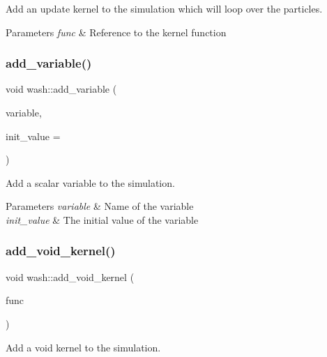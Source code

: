 Add an update kernel to the simulation which will loop over the particles. 


\begin{DoxyParams}{Parameters}
{\em func} & Reference to the kernel function \\
\hline
\end{DoxyParams}
\mbox{\label{namespacewash_ae40d87ba5e1d4b16f1cc52932a030b3d}} 
\subsubsection{\texorpdfstring{add\+\_\+variable()}{add\_variable()}}
{\footnotesize\ttfamily void wash\+::add\+\_\+variable (\begin{DoxyParamCaption}\item[{const std\+::string}]{variable,  }\item[{double}]{init\+\_\+value = {} }\end{DoxyParamCaption})}



Add a scalar variable to the simulation. 


\begin{DoxyParams}{Parameters}
{\em variable} & Name of the variable \\
\hline
{\em init\+\_\+value} & The initial value of the variable \\
\hline
\end{DoxyParams}
\mbox{\label{namespacewash_ab49fcc701f7afced2186465ba5cce978}} 
\subsubsection{\texorpdfstring{add\+\_\+void\+\_\+kernel()}{add\_void\_kernel()}}
{\footnotesize\ttfamily void wash\+::add\+\_\+void\+\_\+kernel (\begin{DoxyParamCaption}\item[{const Void\+FuncT}]{func }\end{DoxyParamCaption})}



Add a void kernel to the simulation. 


